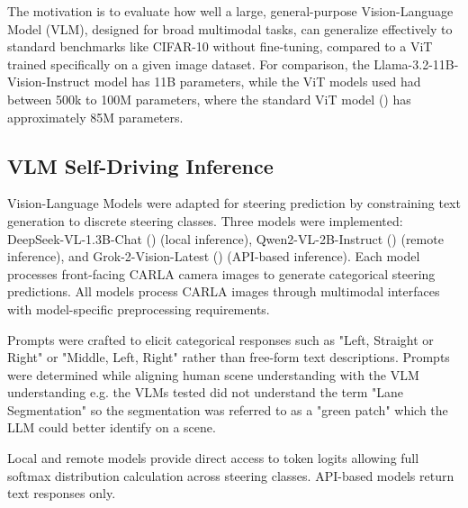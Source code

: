 The motivation is to evaluate how well a large, general-purpose Vision-Language Model (VLM), designed for broad multimodal tasks, can generalize effectively to standard benchmarks like CIFAR-10 without fine-tuning, compared to a ViT trained specifically on a given image dataset. For comparison, the Llama-3.2-11B-Vision-Instruct model has 11B parameters, while the ViT models used had between 500k to 100M parameters, where the standard  ViT model (\cite{dosovitskiy17}) has approximately 85M parameters.

\subsection{VLM Self-Driving Inference}
\label{methods:vlm_self_driving}

Vision-Language Models were adapted for steering prediction by constraining text generation to discrete steering classes. Three models were implemented: DeepSeek-VL-1.3B-Chat (\cite{zeng2024deepseek}) (local inference), Qwen2-VL-2B-Instruct (\cite{bai2023qwen}) (remote inference), and Grok-2-Vision-Latest (\cite{xai2025grok2vision}) (API-based inference). Each model processes front-facing CARLA camera images to generate categorical steering predictions. All models process CARLA images through multimodal interfaces with model-specific preprocessing requirements.

Prompts were crafted to elicit categorical responses such as  "Left, Straight or Right" or "Middle, Left, Right" rather than free-form text descriptions. Prompts were determined while aligning human scene understanding with the VLM understanding e.g. the VLMs tested did not understand the term "Lane Segmentation" so the segmentation was referred to as a "green patch" which the LLM could better identify on a scene.

Local and remote models provide direct access to token logits allowing full softmax distribution calculation across steering classes. API-based models return text responses only.


